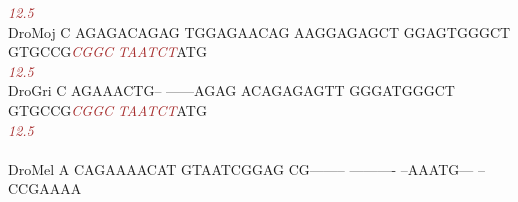 \documentclass[11pt,twoside,reqno,a4paper]{article}
\begin{document}
{\hspace*{7\charwidth}\hspace*{1\charwidth}\hspace*{1\charwidth}\hspace*{1\charwidth}\hspace*{1\charwidth}\hspace*{1\charwidth}\hspace*{47\charwidth}\textit{\textcolor{Brown}{12.5}}\hspace*{1\charwidth}\\
DroMoj	C	AGAGACAGAG	TGGAGAACAG	AAGGAGAGCT	GGAGTGGGCT	GTGCCG\textit{\textcolor{Brown}{C}}\textit{\textcolor{Brown}{G}}\textit{\textcolor{Brown}{G}}\textit{\textcolor{Brown}{C}}	\textit{\textcolor{Brown}{T}}\textit{\textcolor{Brown}{A}}\textit{\textcolor{Brown}{A}}\textit{\textcolor{Brown}{T}}\textit{\textcolor{Brown}{C}}\textit{\textcolor{Brown}{T}}ATG\\
\hspace*{7\charwidth}\hspace*{1\charwidth}\hspace*{1\charwidth}\hspace*{1\charwidth}\hspace*{1\charwidth}\hspace*{1\charwidth}\hspace*{47\charwidth}\textit{\textcolor{Brown}{12.5}}\hspace*{1\charwidth}\\
DroGri	C	AGAAACTG--	------AGAG	ACAGAGAGTT	GGGATGGGCT	GTGCCG\textit{\textcolor{Brown}{C}}\textit{\textcolor{Brown}{G}}\textit{\textcolor{Brown}{G}}\textit{\textcolor{Brown}{C}}	\textit{\textcolor{Brown}{T}}\textit{\textcolor{Brown}{A}}\textit{\textcolor{Brown}{A}}\textit{\textcolor{Brown}{T}}\textit{\textcolor{Brown}{C}}\textit{\textcolor{Brown}{T}}ATG\\
\hspace*{7\charwidth}\hspace*{1\charwidth}\hspace*{1\charwidth}\hspace*{1\charwidth}\hspace*{1\charwidth}\hspace*{1\charwidth}\hspace*{47\charwidth}\textit{\textcolor{Brown}{12.5}}\hspace*{1\charwidth}\\
\\
DroMel	A	CAGAAAACAT	GTAATCGGAG	CG--------	----------	--AAATG---	--CCGAAAA\\
}
\end{document}
